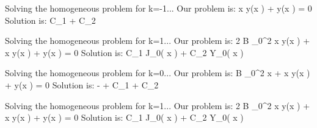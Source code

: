 Solving the homogeneous problem for k=-1...
Our problem is:
 x  y{\left(x \right)} +  y{\left(x \right)} = 0
Solution is:
C_{1} + C_{2} 

Solving the homogeneous problem for k=1...
Our problem is:
 2 B \mu_{0}^{2} x y{\left(x \right)} + x  y{\left(x \right)} +  y{\left(x \right)} = 0
Solution is:
C_{1} J_{0}\left( x \right) + C_{2} Y_{0}\left( x \right)

Solving the homogeneous problem for k=0...
Our problem is:
 B \mu_{0}^{2} x + x  y{\left(x \right)} +  y{\left(x \right)} = 0
Solution is:
-  + C_{1} + C_{2} 

Solving the homogeneous problem for k=1...
Our problem is:
 2 B \mu_{0}^{2} x y{\left(x \right)} + x  y{\left(x \right)} +  y{\left(x \right)} = 0
Solution is:
C_{1} J_{0}\left( x \right) + C_{2} Y_{0}\left( x \right)
